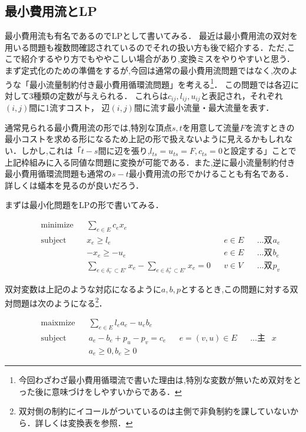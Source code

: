\documentclass[13pt]{jarticle}
\theoremstyle{nonitalic} %
\begin{document}
\subsection{最小費用流とLP}
\label{sec:mcf}
最小費用流も有名であるのでLPとして書いてみる． 
最近は最小費用流の双対を用いる問題も複数問確認されているのでそれの扱い方も後で紹介する．ただ,ここで紹介するやり方でもややこしい場合があり,変換ミスをやりやすいと思う． \\


まず定式化のための準備をするが,今回は通常の最小費用流問題ではなく,次のような「最小流量制約付き最小費用循環流問題」を考える\footnote{今回わざわざ最小費用循環流で書いた理由は,特別な変数が無いため双対をとった後に意味づけをしやすいからである．}．
この問題では各辺に対して3種類の定数が与えられる． これらは$c_{ij}, l_{ij}, u_{ij}$と表記され，それぞれ $(i,j)$間に1流すコスト， 辺$(i,j)$間に流す最小流量・最大流量を表す． 

通常見られる最小費用流の形では,特別な頂点$s,t$を用意して流量$F$を流すときの最小コストを求める形になるため上記の形で扱えないように見えるかもしれない．しかし,これは「$t-s$間に辺を張り,$l_{ts}=u_{ts} = F, c_{ts}=0$と設定する」ことで上記枠組みに入る同値な問題に変換が可能である．また,逆に最小流量制約付き最小費用循環流問題も通常の$s-t$最小費用流の形でかけることも有名である．詳しくは蟻本を見るのが良いだろう．

まずは最小化問題をLPの形で書いてみる．

\begin{align}
 &&&&&\textrm{minimize}   && \sum_{e\in E} c_e x_e  \\
 &&&&&\textrm{subject to} && x_{e} \geq l_e & &e  \in E && \textrm{...双対変数$a_e$} \\
 &&&&& && -x_{e} \geq -u_e && e \in E && \textrm{...双対変数$b_e$}\\
 &&&&&                    && \sum_{e \in \delta_v^-  \subset E'} x_e - \sum_{e \in \delta_v^+  \subset E'} x_e= 0 && v \in V && \textrm{...双対変数$p_v$} &&&&& 
\end{align}

双対変数は上記のような対応になるように$a,b,p$とするとき,この問題に対する双対問題は次のようになる\footnote{双対側の制約にイコールがついているのは主側で非負制約を課していないから．詳しくは変換表を参照．}．

\begin{align}
&&&&&\textrm{maixmize}   && \sum_{e\in E} l_e a_e - u_e b_e  \\
&&&&&\textrm{subject to} && a_e - b_e + p_u - p_v = c_e && e = (v,u) \in E  && \textrm{...主変数$x$}& \\
&&&&& && a_e \geq 0, b_e \geq 0 &&&&&&&&
\end{align}
\end{document}
